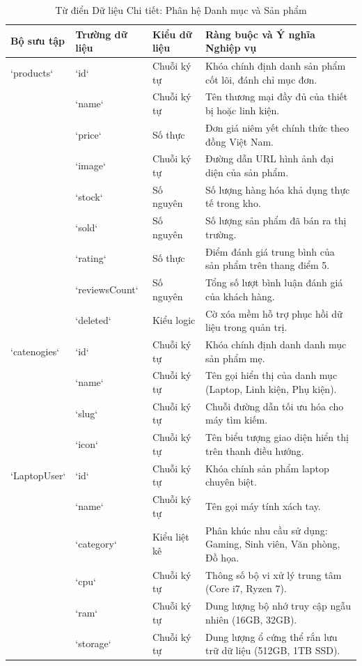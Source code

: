 \begin{table}[H]
\centering
\caption{Từ điển Dữ liệu Chi tiết: Phân hệ Danh mục và Sản phẩm}
\label{tab:dict_catalog}
\begin{tabularx}{\textwidth}{p{2.5cm}p{2.3cm}p{1.8cm}X}
\toprule
\textbf{Bộ sưu tập} & \textbf{Trường dữ liệu} & \textbf{Kiểu dữ liệu} & \textbf{Ràng buộc và Ý nghĩa Nghiệp vụ} \\
\midrule
`products` & `id` & Chuỗi ký tự & Khóa chính định danh sản phẩm cốt lõi, đánh chỉ mục đơn. \\
& `name` & Chuỗi ký tự & Tên thương mại đầy đủ của thiết bị hoặc linh kiện. \\
& `price` & Số thực & Đơn giá niêm yết chính thức theo đồng Việt Nam. \\
& `image` & Chuỗi ký tự & Đường dẫn URL hình ảnh đại diện của sản phẩm. \\
& `stock` & Số nguyên & Số lượng hàng hóa khả dụng thực tế trong kho. \\
& `sold` & Số nguyên & Số lượng sản phẩm đã bán ra thị trường. \\
& `rating` & Số thực & Điểm đánh giá trung bình của sản phẩm trên thang điểm 5. \\
& `reviewsCount` & Số nguyên & Tổng số lượt bình luận đánh giá của khách hàng. \\
& `deleted` & Kiểu logic & Cờ xóa mềm hỗ trợ phục hồi dữ liệu trong quản trị. \\
\addlinespace
`catenogies` & `id` & Chuỗi ký tự & Khóa chính định danh danh mục sản phẩm mẹ. \\
& `name` & Chuỗi ký tự & Tên gọi hiển thị của danh mục (Laptop, Linh kiện, Phụ kiện). \\
& `slug` & Chuỗi ký tự & Chuỗi đường dẫn tối ưu hóa cho máy tìm kiếm. \\
& `icon` & Chuỗi ký tự & Tên biểu tượng giao diện hiển thị trên thanh điều hướng. \\
\addlinespace
`LaptopUser` & `id` & Chuỗi ký tự & Khóa chính sản phẩm laptop chuyên biệt. \\
& `name` & Chuỗi ký tự & Tên gọi máy tính xách tay. \\
& `category` & Kiểu liệt kê & Phân khúc nhu cầu sử dụng: Gaming, Sinh viên, Văn phòng, Đồ họa. \\
& `cpu` & Chuỗi ký tự & Thông số bộ vi xử lý trung tâm (Core i7, Ryzen 7). \\
& `ram` & Chuỗi ký tự & Dung lượng bộ nhớ truy cập ngẫu nhiên (16GB, 32GB). \\
& `storage` & Chuỗi ký tự & Dung lượng ổ cứng thể rắn lưu trữ dữ liệu (512GB, 1TB SSD). \\

\end{tabularx}
\end{table}
